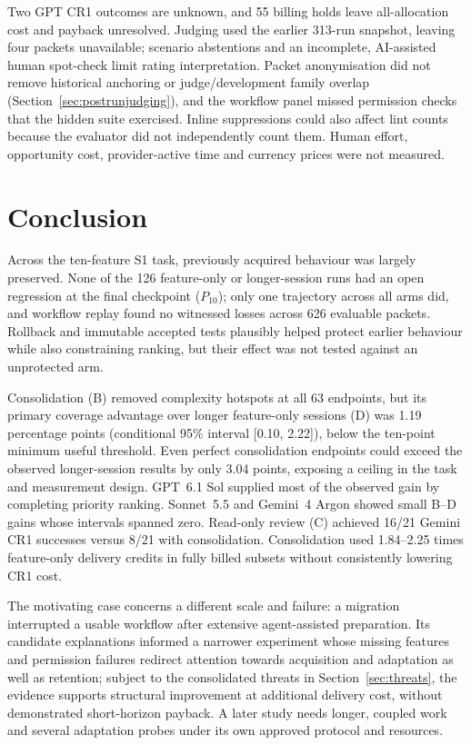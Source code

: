 \documentclass[11pt,a4paper]{article}
\begin{document}
Two GPT CR1 outcomes are unknown, and 55 billing holds leave all-allocation
cost and payback unresolved. Judging used the earlier 313-run snapshot,
leaving four packets unavailable; scenario abstentions and an incomplete,
AI-assisted human spot-check limit rating interpretation. Packet
anonymisation did not remove historical anchoring or judge/development
family overlap (Section~\ref{sec:postrunjudging}), and the workflow panel
missed permission checks that the hidden suite exercised.
Inline suppressions could also affect lint counts because the evaluator
did not independently count them. Human effort, opportunity cost,
provider-active time and currency prices were not measured.

\FloatBarrier
\section{Conclusion}\label{sec:conclusion}

Across the ten-feature S1 task, previously acquired behaviour was largely
preserved. None of the 126 feature-only or longer-session runs had an open
regression at the final checkpoint ($P_{10}$); only one trajectory across
all arms did, and workflow replay found no witnessed losses across 626
evaluable packets. Rollback and immutable accepted tests plausibly helped
protect earlier behaviour while also constraining ranking, but their effect
was not tested against an unprotected arm.

Consolidation (B) removed complexity hotspots at all 63 endpoints, but its
primary coverage advantage over longer feature-only sessions (D) was
1.19 percentage points (conditional 95\% interval [0.10, 2.22]), below the
ten-point minimum useful threshold. Even perfect consolidation endpoints
could exceed the observed longer-session results by only 3.04 points,
exposing a ceiling in the task and measurement design.
GPT~6.1 Sol supplied most of the observed gain by
completing priority ranking. Sonnet~5.5 and Gemini~4 Argon showed small B--D gains whose
intervals spanned zero. Read-only review (C) achieved 16/21 Gemini CR1
successes versus 8/21 with consolidation.
Consolidation used 1.84--2.25 times feature-only delivery credits in
fully billed subsets without consistently lowering CR1 cost.

The motivating case concerns a different scale and failure: a migration
interrupted a usable workflow after extensive agent-assisted preparation.
Its candidate explanations informed a narrower experiment whose missing features
and permission failures redirect attention towards acquisition and adaptation as
well as retention; subject to the consolidated threats
in Section~\ref{sec:threats}, the evidence supports structural improvement
at additional delivery cost, without demonstrated short-horizon payback.
A later study needs longer, coupled work and several adaptation probes
under its own approved protocol and resources.
\end{document}
